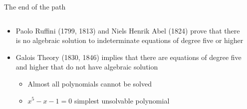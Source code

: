 \begin{frame}{The end of the path}

\begin{columns}

  \begin{column}{7.5cm}
  \begin{itemize}
  \item Paolo Ruffini (1799, 1813) and Niels Henrik Abel (1824) prove
    that there is no algebraic solution to indeterminate equations of
    degree five or higher \vspace{0.5em}
  \item Galois Theory (1830, 1846) implies that there are equations of
    degree five and higher that do not have algebraic solution \vspace{0.2em}
    \begin{itemize}
    \item Almost all polynomials cannot be solved \vspace{0.1em}
    \item $x^{5}-x-1=0$ simplest unsolvable polynomial
    \end{itemize}
  \end{itemize}
  \end{column}

  \begin{column}{4.5cm}
  \end{column}

\end{columns}

\end{frame}
